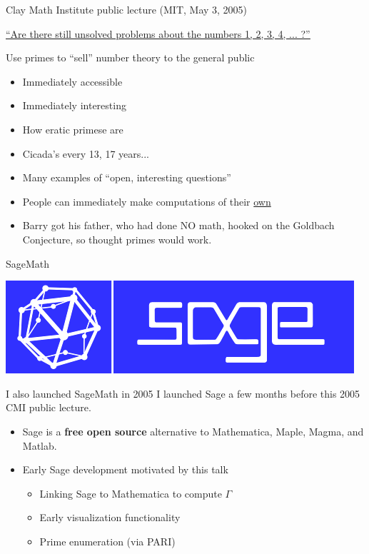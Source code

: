\documentclass{beamer}
\begin{document}
\begin{frame}{Clay Math Institute public lecture (MIT, May 3, 2005)}
  \begin{center}
    \href{http://www.claymath.org/library/public\_lectures/mazur\_riemann\_hypothesis.pdf}{\small\underline{``Are there still unsolved problems about the numbers 1, 2, 3, 4, ... ?''}}
  \end{center}

  \vfill

  \begin{block}{Use primes to ``sell'' number theory to the general public}
    \begin{itemize}
      \item   Immediately accessible
      \item   Immediately interesting
      \item   How eratic primese are
      \item   Cicada's every 13, 17 years...
      \item   Many examples of ``open, interesting questions''
      \item   People can immediately make computations of their \underline{own}
      \item   Barry got his father, who had done NO
            math, hooked on the Goldbach Conjecture, so thought
            primes would work.
    \end{itemize}
  \end{block}
\end{frame}

\begin{frame}{SageMath}
  \vfill
  \begin{center}
    \includegraphics[width=.7\textwidth]{pics/sage-logo}
  \end{center}
  \vfill

  \begin{block}{I also launched SageMath in 2005}
    I launched Sage a few months before this 2005 CMI public lecture.
    \begin{itemize}
      \item Sage is a {\bf free open source} alternative to Mathematica, Maple, Magma, and Matlab.
      \item Early Sage development motivated by this talk
            \begin{itemize}
              \item Linking Sage to Mathematica to compute $\Gamma$
              \item Early visualization functionality
              \item Prime enumeration (via PARI)
            \end{itemize}
    \end{itemize}
  \end{block}
\end{frame}
\end{document}
